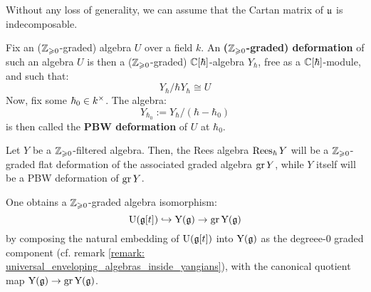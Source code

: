         Without any loss of generality, we can assume that the Cartan matrix of $\mathfrak{u}$ is indecomposable. 
    
        \begin{definition} \label{def: graded_and_PBW_deformations}
            Fix an ($\mathbb{Z}_{\geqslant 0}$-graded) algebra $U$ over a field $k$. An \textbf{($\mathbb{Z}_{\geqslant 0}$-graded) deformation} of such an algebra $U$ is then a ($\mathbb{Z}_{\geqslant 0}$-graded) $\mathbb{C}[\hbar]$-algebra $Y_{\hbar}$, free as a $\mathbb{C}[\hbar]$-module, and such that:
                $$Y_{\hbar}/\hbar Y_{\hbar} \cong U$$
            Now, fix some $\hbar_0 \in k^{\x}$. The algebra:
                $$Y_{\hbar_0} := Y_{\hbar}/(\hbar - \hbar_0)$$
            is then called the \textbf{PBW deformation} of $U$ at $\hbar_0$. 
        \end{definition}
        \begin{lemma} \label{lemma: rees_algebras_as_graded_deformations}
            Let $Y$ be a $\mathbb{Z}_{\geqslant 0}$-filtered algebra. Then, the Rees algebra $\operatorname{Rees}_{\hbar} Y$ will be a $\mathbb{Z}_{\geqslant 0}$-graded flat deformation of the associated graded algebra $\operatorname{gr} Y$, while $Y$ itself will be a PBW deformation of $\operatorname{gr} Y$.
        \end{lemma}

        \begin{theorem} \label{theorem: finite_type_yangians_PBW}
            \cite{levendorskii_finite_type_yangians_PBW} One obtains a $\mathbb{Z}_{\geqslant 0}$-graded algebra isomorphism:
                $$\mathrm{U}(\mathfrak{g}[t]) \hookrightarrow \mathrm{Y}(\mathfrak{g}) \to \operatorname{gr} \mathrm{Y}(\mathfrak{g})$$
            by composing the natural embedding of $\mathrm{U}(\mathfrak{g}[t])$ into $\mathrm{Y}(\mathfrak{g})$ as the degreee-$0$ graded component (cf. remark \ref{remark: universal_enveloping_algebras_inside_yangians}), with the canonical quotient map $\mathrm{Y}(\mathfrak{g}) \to \operatorname{gr} \mathrm{Y}(\mathfrak{g})$.
        \end{theorem}
        
